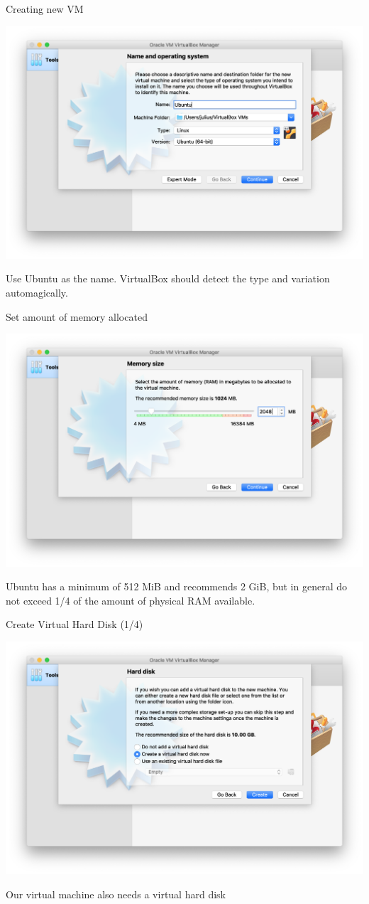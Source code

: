 \documentclass[12pt]{beamer}
\begin{document}
\begin{frame}{Creating new VM}
  \begin{center}
    \includegraphics[width=0.8\linewidth]{vb-new}
  \end{center}
  Use Ubuntu as the name. VirtualBox should detect the type and variation automagically.
\end{frame}

\begin{frame}{Set amount of memory allocated}
  \begin{center}
    \includegraphics[width=0.8\linewidth]{vb-mem}
  \end{center}
  Ubuntu has a minimum of 512 MiB and recommends 2 GiB, but in general do not exceed 1/4 of the amount of physical RAM available.
\end{frame}

\begin{frame}{Create Virtual Hard Disk (1/4)}
  \begin{center}
    \includegraphics[width=0.8\linewidth]{vb-hd}
  \end{center}
  Our virtual machine also needs a virtual hard disk
\end{frame}
\end{document}

